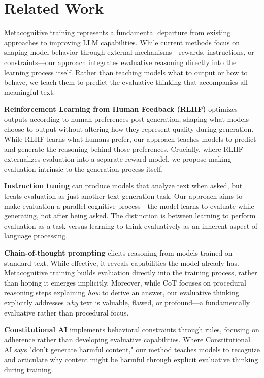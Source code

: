 \documentclass[11pt]{article}
\begin{document}
	\section{Related Work}
	
	Metacognitive training represents a fundamental departure from existing approaches to improving LLM capabilities. While current methods focus on shaping model behavior through external mechanisms—rewards, instructions, or constraints—our approach integrates evaluative reasoning directly into the learning process itself. Rather than teaching models what to output or how to behave, we teach them to predict the evaluative thinking that accompanies all meaningful text.
	
	\textbf{Reinforcement Learning from Human Feedback (RLHF)} \cite{christiano2017deep} optimizes outputs according to human preferences post-generation, shaping what models choose to output without altering how they represent quality during generation. While RLHF learns what humans prefer, our approach teaches models to predict and generate the reasoning behind those preferences. Crucially, where RLHF externalizes evaluation into a separate reward model, we propose making evaluation intrinsic to the generation process itself.
	
	\textbf{Instruction tuning} \cite{wei2021finetuned} can produce models that analyze text when asked, but treats evaluation as just another text generation task. Our approach aims to make evaluation a parallel cognitive process—the model learns to evaluate while generating, not after being asked. The distinction is between learning to perform evaluation as a task versus learning to think evaluatively as an inherent aspect of language processing.
	
	\textbf{Chain-of-thought prompting} \cite{wei2022chain} elicits reasoning from models trained on standard text. While effective, it reveals capabilities the model already has. Metacognitive training builds evaluation directly into the training process, rather than hoping it emerges implicitly. Moreover, while CoT focuses on procedural reasoning steps explaining \emph{how} to derive an answer, our evaluative thinking explicitly addresses \emph{why} text is valuable, flawed, or profound—a fundamentally evaluative rather than procedural focus.
	
	\textbf{Constitutional AI} \cite{bai2022constitutional} implements behavioral constraints through rules, focusing on adherence rather than developing evaluative capabilities. Where Constitutional AI says "don't generate harmful content," our method teaches models to recognize and articulate why content might be harmful through explicit evaluative thinking during training.
	
\end{document}
